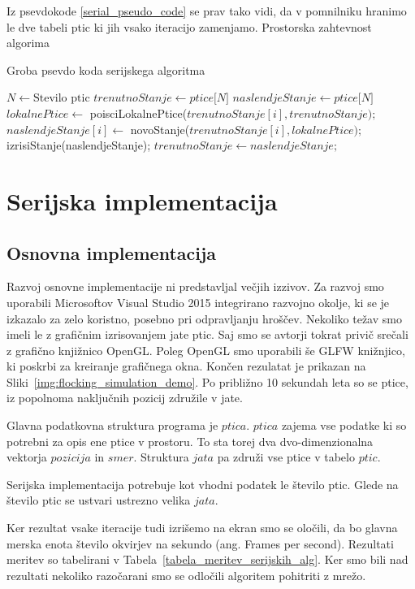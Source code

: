 \documentclass[a4paper, 12pt]{book}
\begin{document}
Iz psevdokode \ref{serial_pseudo_code} se prav tako vidi, da v pomnilniku hranimo le dve tabeli ptic ki jih vsako iteracijo zamenjamo. Prostorska zahtevnost algorima
\begin{algorithm}
\caption{Groba psevdo koda serijskega algoritma}\label{serial_pseudo_code}
\begin{algorithmic}[1]
\State $N \gets \text{Stevilo ptic}$
\State $trenutnoStanje \gets \textit{ptice[N]}$
\State $naslendjeStanje \gets \textit{ptice[N]}$
\Loop
{}
\State $lokalnePtice \gets$ poisciLokalnePtice($trenutnoStanje[i], trenutnoStanje);$
\State $naslendjeStanje[i] \gets$ novoStanje($trenutnoStanje[i], lokalnePtice);$
\EndFor
\State izrisiStanje(naslendjeStanje);
\State $trenutnoStanje \gets naslendjeStanje;$
\EndLoop
\end{algorithmic}
\end{algorithm}

\chapter{Serijska implementacija}
\label{ch1}
\section{Osnovna implementacija}
Razvoj osnovne implementacije ni predstavljal večjih izzivov. Za razvoj smo uporabili Microsoftov Visual Studio 2015 integrirano razvojno okolje, ki se je izkazalo za zelo koristno, posebno pri odpravljanju hroščev. Nekoliko težav smo imeli le z grafičnim izrisovanjem jate ptic. Saj smo se avtorji tokrat privič srečali z grafično knjižnico OpenGL. Poleg OpenGL smo uporabili še GLFW knižnjico, ki poskrbi za kreiranje grafičnega okna. Končen rezulatat je prikazan na Sliki~\ref{img:flocking_simulation_demo}. Po približno 10 sekundah leta so se ptice, iz popolnoma naključnih pozicij združile v jate.

Glavna podatkovna struktura programa je $ptica$. $ptica$ zajema vse podatke ki so potrebni za opis ene ptice v prostoru. To sta torej dva dvo-dimenzionalna vektorja $pozicija$ in $smer$. Struktura $jata$ pa združi vse ptice v tabelo $ptic$.

Serijska implementacija potrebuje kot vhodni podatek le število ptic. Glede na število ptic se ustvari ustrezno velika $jata$.

Ker rezultat vsake iteracije tudi izrišemo na ekran smo se oločili, da bo glavna merska enota število okvirjev na sekundo (ang. Frames per second). Rezultati meritev so tabelirani v Tabela~\ref{tabela_meritev_serijskih_alg}. Ker smo bili nad rezultati nekoliko razočarani smo se odločili algoritem pohitriti z mrežo.
\end{document}
